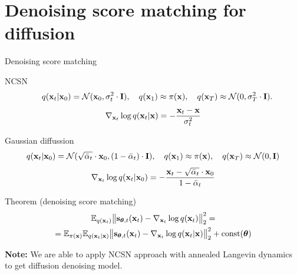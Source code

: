 \section{Denoising score matching for diffusion}
\begin{frame}{Denoising score matching}
	\begin{block}{NCSN} 
		\vspace{-0.7cm} 
		\[
			\quad q(\mathbf{x}_t | \mathbf{x}_0) = \mathcal{N}(\mathbf{x}_0, \sigma_t^2 \cdot \mathbf{I}), \quad q(\mathbf{x}_1) \approx \pi(\mathbf{x}), \quad q(\mathbf{x}_T) \approx \mathcal{N}(0, \sigma_T^2 \cdot \mathbf{I}).
		\]
		\[
			\nabla_{\mathbf{x}_t} \log q(\mathbf{x}_t | \mathbf{x}) = - \frac{\mathbf{x}_t - \mathbf{x}}{\sigma_t^2}
		\]
		\vspace{-0.6cm} 
	\end{block}
	\begin{block}{Gaussian diffussion}
		\vspace{-0.7cm} 
		\[
			q(\mathbf{x}_t | \mathbf{x}_0) = \mathcal{N}(\sqrt{\bar{\alpha}_t} \cdot \mathbf{x}_0, (1 - \bar{\alpha}_t) \cdot \mathbf{I}), \quad q(\mathbf{x}_1) \approx \pi(\mathbf{x}), \quad q(\mathbf{x}_T) \approx \mathcal{N}(0, \mathbf{I})
		\]
		\[
			\nabla_{\mathbf{x}_t} \log q(\mathbf{x}_t | \mathbf{x}_0) = - \frac{\mathbf{x}_t - \sqrt{\bar{\alpha}_t} \cdot \mathbf{x}_0}{1 - \bar{\alpha}_t}
		\]
		\vspace{-0.6cm} 
	\end{block}
	\begin{block}{Theorem (denoising score matching)}
	\vspace{-0.7cm}
	\begin{multline*}
		\mathbb{E}_{q(\mathbf{x}_t)}\bigl\| \mathbf{s}_{\boldsymbol{\theta}, t}(\mathbf{x}_t) - \nabla_{\mathbf{x}_t} \log q(\mathbf{x}_t) \bigr\|^2_2 = \\
		= \mathbb{E}_{\pi(\mathbf{x})} \mathbb{E}_{q(\mathbf{x}_t | \mathbf{x})}\bigl\| \mathbf{s}_{\boldsymbol{\theta}, t}(\mathbf{x}_t) - \nabla_{\mathbf{x}_t} \log q(\mathbf{x}_t | \mathbf{x}) \bigr\|^2_2 + \text{const}(\boldsymbol{\theta})
	\end{multline*}
	\vspace{-0.5cm}
	\end{block}
	\textbf{Note:} We are able to apply NCSN approach with annealed Langevin dynamics to get diffusion denoising model.
\end{frame}

